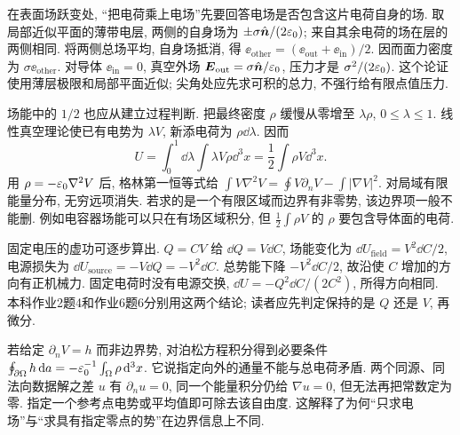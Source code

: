 在表面场跃变处, “把电荷乘上电场”先要回答电场是否包含这片电荷自身的场. 取局部近似平面的薄带电层, 两侧的自身场为 $\pm\sigma\hat{\boldsymbol{n}}/(2\varepsilon_0)$; 来自其余电荷的场在层的两侧相同. 将两侧总场平均, 自身场抵消, 得 $\ee_\mathrm{other}=(\ee_\mathrm{out}+\ee_\mathrm{in})/2$. 因而面力密度为 $\sigma\ee_\mathrm{other}$. 对导体 $\ee_\mathrm{in}=0$, 真空外场 $\boldsymbol{E}_\mathrm{out}=\sigma\hat{\boldsymbol{n}}/\varepsilon_0$, 压力才是 $\sigma^2/(2\varepsilon_0)$. 这个论证使用薄层极限和局部平面近似; 尖角处应先求可积的总力, 不强行给有限点值压力.

场能中的 $1/2$ 也应从建立过程判断. 把最终密度 $\rho$ 缓慢从零增至 $\lambda\rho$, $0\le\lambda\le1$. 线性真空理论使已有电势为 $\lambda V$, 新添电荷为 $\rho\dd\lambda$. 因而
\[
 U=\int_0^1\dd\lambda\int\lambda V\rho\dd^3x
 =\frac12\int\rho V\dd^3x.
\]
用 $\rho=-\varepsilon_0\nabla^2V$ 后, 格林第一恒等式给
$\int V\nabla^2V=\oint V\partial_nV-\int|\nabla V|^2$.
对局域有限能量分布, 无穷远项消失. 若求的是一个有限区域而边界有非零势, 该边界项一般不能删. 例如电容器场能可以只在有场区域积分, 但 $\frac12\int\rho V$ 的 $\rho$ 要包含导体面的电荷.

固定电压的虚功可逐步算出. $Q=CV$ 给 $\dd Q=V\dd C$, 场能变化为 $\dd U_\mathrm{field}=V^2\dd C/2$, 电源损失为 $\dd U_\mathrm{source}=-V\dd Q=-V^2\dd C$. 总势能下降 $-V^2\dd C/2$, 故沿使 $C$ 增加的方向有正机械力. 固定电荷时没有电源交换, $\dd U=-Q^2\dd C/(2C^2)$, 所得方向相同. 本科作业2题4和作业6题6分别用这两个结论; 读者应先判定保持的是 $Q$ 还是 $V$, 再微分.

若给定 $\partial_nV=h$ 而非边界势, 对泊松方程积分得到必要条件
$\oint_{\partial\Omega}h\,\mathrm d a=-\varepsilon_0^{-1}\int_\Omega\rho\,\mathrm d^3x$. 它说指定向外的通量不能与总电荷矛盾. 两个同源、同法向数据解之差 $u$ 有 $\partial_nu=0$, 同一个能量积分仍给 $\nabla u=0$, 但无法再把常数定为零. 指定一个参考点电势或平均值即可除去该自由度. 这解释了为何“只求电场”与“求具有指定零点的势”在边界信息上不同.
